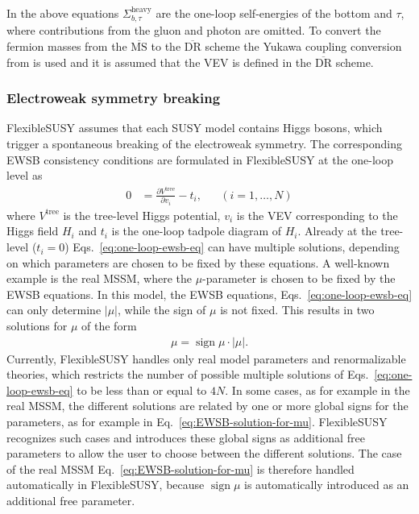\documentclass[final,3p,11pt,pdflatex]{elsarticle}
\makeatletter
\newcommand{\fs}{FlexibleSUSY\@\xspace}
\newcommand{\textoverline}[1]{$\overline{\mbox{#1}}$}
\newcommand{\DRbar}{\textoverline{DR}\xspace}
\newcommand{\MSbar}{\textoverline{MS}\xspace}
\DeclareMathOperator{\sign}{sign}
\makeatother
\begin{document}
%
In the above equations $\Sigma_{b,\tau}^{\text{heavy}}$ are the
one-loop self-energies of the bottom and $\tau$, where contributions
from the gluon and photon are omitted.  To convert the fermion masses
from the \MSbar to the \DRbar scheme the Yukawa coupling conversion
from \cite{Martin:1993yx} is used and it is assumed that the VEV is
defined in the \DRbar scheme.

\subsubsection{Electroweak symmetry breaking}
\label{sec:ewsb}

\fs assumes that each SUSY model contains Higgs bosons, which trigger
a spontaneous breaking of the electroweak symmetry.  The corresponding
EWSB consistency conditions are formulated in \fs at the one-loop
level as
%
\begin{align}
  0 &= \frac{\partial V^\text{tree}}{\partial v_i} - t_i,
  & & (i=1,\ldots,N)
  \label{eq:one-loop-ewsb-eq}
\end{align}
%
where $V^\text{tree}$ is the tree-level Higgs potential, $v_i$ is the
VEV corresponding to the Higgs field $H_i$ and $t_i$ is the one-loop
tadpole diagram of $H_i$.  Already at the tree-level ($t_i = 0$) Eqs.\
\eqref{eq:one-loop-ewsb-eq} can have multiple solutions, depending on
which parameters are chosen to be fixed by these equations.  A
well-known example is the real MSSM, where the $\mu$-parameter is
chosen to be fixed by the EWSB equations.  In this model, the EWSB
equations, Eqs.\ \eqref{eq:one-loop-ewsb-eq} can only determine
$|\mu|$, while the sign of $\mu$ is not fixed.  This results in two
solutions for $\mu$ of the form
%
\begin{align}
  \mu = \sign\mu \cdot |\mu| .
  \label{eq:EWSB-solution-for-mu}
\end{align}
%
Currently, \fs handles only real model parameters and renormalizable
theories, which restricts the number of possible multiple solutions of
Eqs.\ \eqref{eq:one-loop-ewsb-eq} to be less than or equal to $4N$.  In
some cases, as for example in the real MSSM, the different solutions
are related by one or more global signs for the parameters, as for example in
Eq.~\eqref{eq:EWSB-solution-for-mu}.  \fs recognizes such cases and
introduces these global signs as additional free parameters to allow
the user to choose between the different solutions.  The case of the
real MSSM Eq.~\eqref{eq:EWSB-solution-for-mu} is therefore handled
automatically in \fs, because $\sign\mu$ is automatically introduced
as an additional free parameter.
\end{document}
